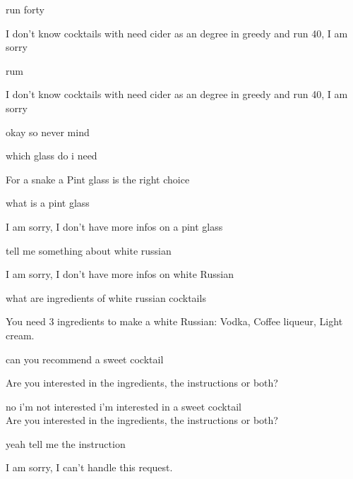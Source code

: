\documentclass[12pt,letterpaper]{article}
\begin{document}
\begin{dialogue}
 run forty

 I don't know cocktails with need cider as an degree in greedy and run 40, I am sorry

 rum

 I don't know cocktails with need cider as an degree in greedy and run 40, I am sorry

 okay so never mind

 which glass do i need

 For a snake a Pint glass is the right choice

 what is a pint glass

 I am sorry, I don't have more infos on a pint glass

 tell me something about white russian

 I am sorry, I don't have more infos on white Russian\\

 what are ingredients of white russian cocktails

 You need 3 ingredients to make a white Russian: Vodka, Coffee liqueur, Light cream.

 can you recommend a sweet cocktail\\

 Are you interested in the ingredients, the instructions or both?

 no i'm not interested i'm interested in a sweet cocktail\\
 Are you interested in the ingredients, the instructions or both?

 yeah tell me the instruction

 I am sorry, I can't handle this request.
\end{dialogue}
\end{document}
